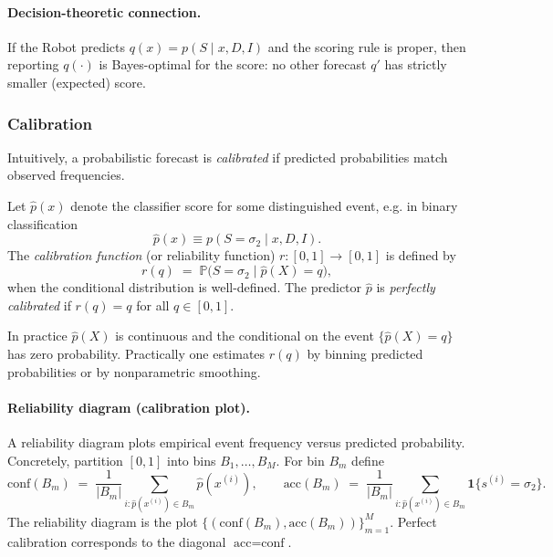 \paragraph{Decision-theoretic connection.} If the Robot predicts \(q(x)=p(S\mid x,D,I)\) and the scoring rule is proper, then reporting \(q(\cdot)\) is Bayes-optimal for the score: no other forecast \(q'\) has strictly smaller (expected) score.

\subsubsection{Calibration}
Intuitively, a probabilistic forecast is \emph{calibrated} if predicted probabilities match observed frequencies.

\begin{definition}
	Let \(\widehat p(x)\) denote the classifier score for some distinguished event, e.g. in binary classification
	\[
	\widehat p(x) \equiv p(S=\sigma_2\mid x, D, I).
	\]
	The \emph{calibration function} (or reliability function) \(r:[0,1]\to[0,1]\) is defined by
	\[
	r(q) \;=\; \mathbb{P}\big( S=\sigma_2 \mid \widehat p(X)=q \big),
	\]
	when the conditional distribution is well-defined.  The predictor \(\widehat p\) is \emph{perfectly calibrated} if \(r(q)=q\) for all \(q\in[0,1]\).
\end{definition}

In practice \(\widehat p(X)\) is continuous and the conditional on the event \(\{\widehat p(X)=q\}\) has zero probability.  Practically one estimates \(r(q)\) by binning predicted probabilities or by nonparametric smoothing.

\paragraph{Reliability diagram (calibration plot).}
A reliability diagram plots empirical event frequency versus predicted probability. Concretely, partition \([0,1]\) into bins \(B_1,\dots,B_M\). For bin \(B_m\) define
\[
\text{conf}(B_m) \;=\; \frac{1}{|B_m|}\sum_{i: \widehat p(x^{(i)})\in B_m} \widehat p(x^{(i)}),
\qquad
\text{acc}(B_m) \;=\; \frac{1}{|B_m|}\sum_{i: \widehat p(x^{(i)})\in B_m} \mathbf{1}\{s^{(i)}=\sigma_2\}.
\]
The reliability diagram is the plot \(\{(\text{conf}(B_m),\text{acc}(B_m))\}_{m=1}^M\).  Perfect calibration corresponds to the diagonal \(\text{acc}=\text{conf}\).

